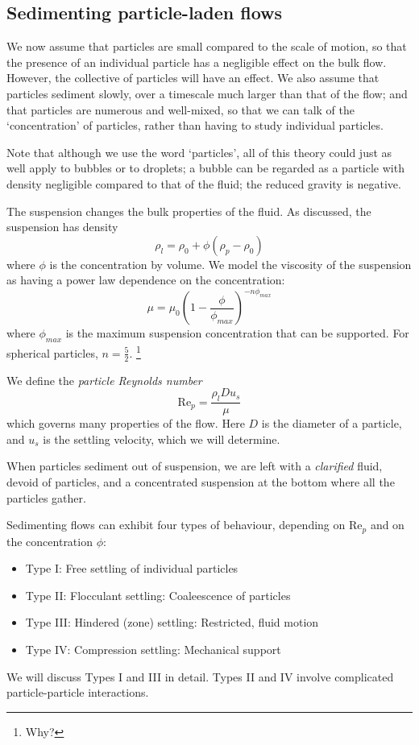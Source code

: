 \subsection{Sedimenting particle-laden flows}

We now assume that particles are small compared to the scale of motion, so that the presence of an individual particle has a negligible effect on the bulk flow. However, the collective of particles will have an effect. We also assume that particles sediment slowly, over a timescale much larger than that of the flow; and that particles are numerous and well-mixed, so that we can talk of the `concentration' of particles, rather than having to study individual particles.

Note that although we use the word `particles', all of this theory could just as well apply to bubbles or to droplets; a bubble can be regarded as a particle with density negligible compared to that of the fluid; the reduced gravity is negative.

The suspension changes the bulk properties of the fluid. As discussed, the suspension has density
\begin{equation}
        \rho_l = \rho_0 + \phi (\rho_p - \rho_0)
\end{equation}
where $\phi$ is the concentration by volume. We model the viscosity of the suspension as having a power law dependence on the concentration: 
\begin{equation}
 \mu = \mu_0 \left( 1 - \frac{\phi}{\phi_{max}} \right)^{-n \phi_{max}}
\end{equation}
where $\phi_{max}$ is the maximum suspension concentration that can be supported. For spherical particles, $n = \frac{5}{2}$.
\footnote{Why?}

We define the \textit{particle Reynolds number}
\begin{equation}
    \mathrm{Re}_p = \frac{\rho_l D u_s}{\mu}
\end{equation}
which governs many properties of the flow. Here $D$ is the diameter of a particle, and $u_s$ is the settling velocity, which we will determine. 

When particles sediment out of suspension, we are left with a \textit{clarified} fluid, devoid of particles, and a concentrated suspension at the bottom where all the particles gather. 

Sedimenting flows can exhibit four types of behaviour, depending on $\mathrm{Re}_p$ and on the concentration $\phi$:
\begin{itemize}
    \item Type I: Free settling of individual particles
    \item Type II: Flocculant settling: Coaleescence of particles
    \item Type III: Hindered (zone) settling: Restricted, fluid motion
    \item Type IV: Compression settling: Mechanical support
\end{itemize}
We will discuss Types I and III in detail. Types II and IV involve complicated particle-particle interactions. 

